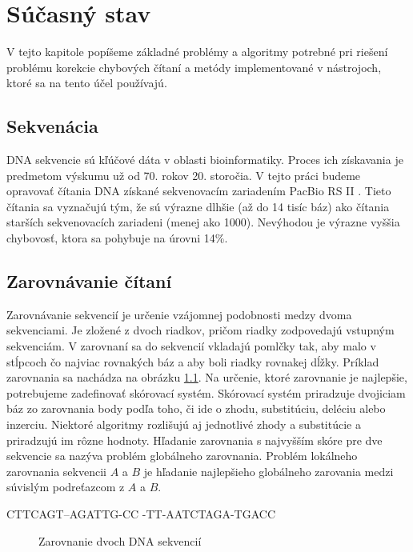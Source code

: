\chapter{Súčasný stav}

V tejto kapitole popíšeme základné problémy a algoritmy potrebné pri riešení problému korekcie chybových čítaní a metódy implementované v nástrojoch, ktoré sa na tento účel používajú.

\section{Sekvenácia}

DNA sekvencie sú kľúčové dáta v oblasti bioinformatiky. Proces ich získavania je predmetom výskumu už od 70. rokov 20. storočia. V tejto práci budeme opravovať čítania DNA získané sekvenovacím zariadením PacBio RS II \citep{Rhoads2015278}. Tieto čítania sa vyznačujú tým, že sú výrazne dlhšie (až do 14 tisíc báz) ako čítania starších sekvenovacích zariadeni (menej ako 1000). Nevýhodou je výrazne vyššia chybovosť, ktora sa pohybuje na úrovni 14\%.

\section{Zarovnávanie čítaní}

Zarovnávanie sekvencií je určenie vzájomnej podobnosti medzy dvoma sekvenciami. Je zložené z dvoch riadkov, pričom riadky zodpovedajú vstup\-ným sekvenciám. V zarovnaní sa do sekvencií vkladajú pomlčky tak, aby malo v stĺpcoch čo najviac rovnakých báz a aby boli riadky rovnakej dĺžky. Príklad zarovnania sa nachádza na obrázku \ref{fig:priklad_zarovnanie}. Na určenie, ktoré zarovnanie je najlepšie, potrebujeme zadefinovať skórovací systém. Skórovací systém priradzuje dvojiciam báz zo zarovnania body podľa toho, či ide o zhodu, substitúciu, deléciu alebo inzerciu. Niektoré algoritmy rozlišujú aj jednotlivé zhody a substitúcie a priradzujú im rôzne hodnoty. Hľadanie zarovnania s najvyšším skóre pre dve sekvencie sa nazýva problém globálneho zarovnania. Problém lokálneho zarovnania sekvencii $A$ a $B$ je hľadanie najlepšieho globálneho zarovania medzi súvislým podreťazcom z $A$ a $B$.

\begin{verbbox}
    CTTCAGT--AGATTG-CC
    -TT-AATCTAGA-TGACC
\end{verbbox}
    
\begin{figure}
    \centering
    \theverbbox
    \caption{Zarovnanie dvoch DNA sekvencií}
    \label{fig:priklad_zarovnanie}
\end{figure}

